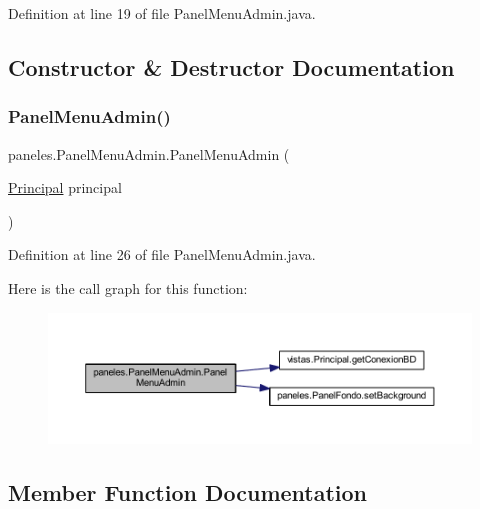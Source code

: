 Definition at line 19 of file Panel\+Menu\+Admin.\+java.



\subsection{Constructor \& Destructor Documentation}
\mbox{\label{classpaneles_1_1_panel_menu_admin_ae686f35c694b90e334b64c385aa959ee}} 
\subsubsection{\texorpdfstring{Panel\+Menu\+Admin()}{PanelMenuAdmin()}}
{\footnotesize\ttfamily paneles.\+Panel\+Menu\+Admin.\+Panel\+Menu\+Admin (\begin{DoxyParamCaption}\item[{\mbox{\hyperlink{classvistas_1_1_principal}{Principal}}}]{principal }\end{DoxyParamCaption})}



Definition at line 26 of file Panel\+Menu\+Admin.\+java.

Here is the call graph for this function\+:\nopagebreak
\begin{figure}[H]
\begin{center}
\leavevmode
\includegraphics[width=350pt]{classpaneles_1_1_panel_menu_admin_ae686f35c694b90e334b64c385aa959ee_cgraph}
\end{center}
\end{figure}


\subsection{Member Function Documentation}
\mbox{\label{classpaneles_1_1_panel_menu_admin_a45a3165ede4cd4e1d926a7d07cedc8a1}} 
